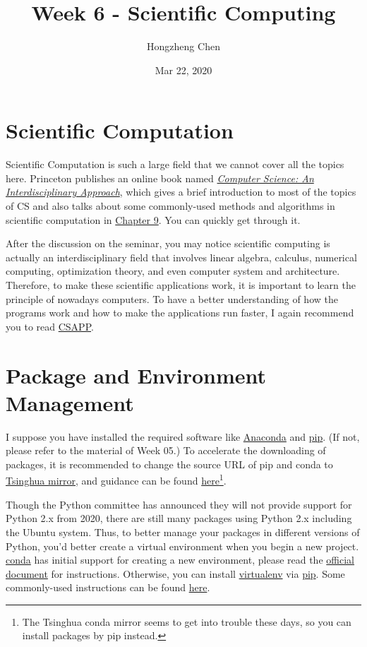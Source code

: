 \documentclass[english]{../TexTemplate/thesis}
\title{Week 6 - Scientific Computing}
\author{Hongzheng Chen}
\date{Mar 22, 2020}
\begin{document}
\maketitle

\section{Scientific Computation}
Scientific Computation is such a large field that we cannot cover all the topics here.
Princeton publishes an online book named \href{https://introcs.cs.princeton.edu/java/home/}{\emph{Computer Science: An Interdisciplinary Approach}}, which gives a brief introduction to most of the topics of CS and also talks about some commonly-used methods and algorithms in scientific computation in \href{https://introcs.cs.princeton.edu/java/90scientific/}{Chapter 9}. You can quickly get through it.

After the discussion on the seminar, you may notice scientific computing is actually an interdisciplinary field that involves linear algebra, calculus, numerical computing, optimization theory, and even computer system and architecture. Therefore, to make these scientific applications work, it is important to learn the principle of nowadays computers.
To have a better understanding of how the programs work and how to make the applications run faster, I again recommend you to read \href{https://csapp.cs.cmu.edu/}{CSAPP}.

\section{Package and Environment Management}
I suppose you have installed the required software like \href{https://www.anaconda.com/}{Anaconda} and \href{https://pypi.org/project/pip/}{pip}. (If not, please refer to the material of Week 05.) To accelerate the downloading of packages, it is recommended to change the source URL of pip and conda to \href{https://mirror.tuna.tsinghua.edu.cn/help/anaconda/}{Tsinghua mirror}, and guidance can be found \href{https://blog.csdn.net/weixin_41765699/article/details/83420149}{here}\footnote{The Tsinghua conda mirror seems to get into trouble these days, so you can install packages by pip instead.}.

Though the Python committee has announced they will not provide support for Python 2.x from 2020, there are still many packages using Python 2.x including the Ubuntu system. Thus, to better manage your packages in different versions of Python, you'd better create a virtual environment when you begin a new project.
\href{https://conda.io/en/latest/}{conda} has initial support for creating a new environment, please read the \href{https://docs.conda.io/projects/conda/en/latest/user-guide/tasks/manage-environments.html}{official document} for instructions.
Otherwise, you can install \href{https://virtualenv.pypa.io/en/latest/}{virtualenv} via \href{https://pypi.org/project/pip/}{pip}. Some commonly-used instructions can be found \href{https://tecadmin.net/use-virtualenv-with-python3/}{here}.
\end{document}
